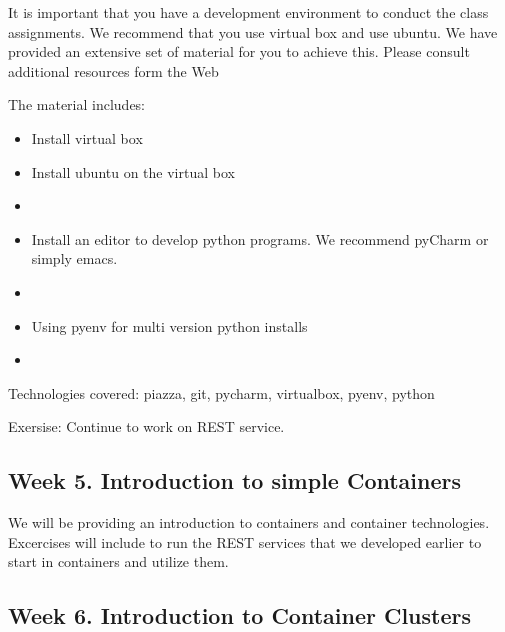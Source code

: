 It is important that you have a development environment to conduct the
class assignments. We recommend that you use virtual box and use
ubuntu. We have provided an extensive set of material for you to
achieve this. Please consult additional resources form the Web

The material includes:


\begin{itemize}
\item Install virtual box

\item Install ubuntu on the virtual box

\item {}

\item Install an editor to develop python programs. We recommend
  pyCharm or simply emacs.

\item {}

\item Using pyenv for multi version python installs

\item {}

\end{itemize}

Technologies covered:	piazza,	git,	pycharm,	virtualbox,	pyenv,	python

Exersise: Continue to work on REST service.

\subsection{Week 5. Introduction to simple Containers}

We will be providing an introduction to containers and container
technologies. Excercises will include to run the REST services that we
developed earlier to start in containers and utilize them.


\subsection{Week 6. Introduction to Container Clusters}

